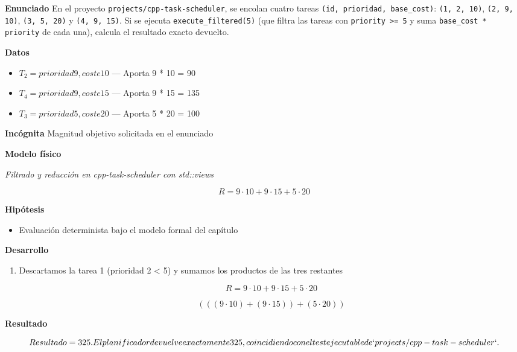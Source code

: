 \documentclass{book}
\begin{document}
\begin{tcolorbox}[title={Problema resuelto}, studiumworked, breakable]

\noindent\textbf{Enunciado}
En el proyecto \texttt{projects/cpp-task-scheduler}, se encolan cuatro tareas \texttt{(id, prioridad, base\_cost)}: \texttt{(1, 2, 10)}, \texttt{(2, 9, 10)}, \texttt{(3, 5, 20)} y \texttt{(4, 9, 15)}. Si se ejecuta \texttt{execute\_filtered(5)} (que filtra las tareas con \texttt{priority >= 5} y suma \texttt{base\_cost * priority} de cada una), calcula el resultado exacto devuelto.

\noindent\textbf{Datos}
\begin{itemize}
\item $T_{2} = prioridad 9, coste 10$ — Aporta 9 * 10 = 90
\item $T_{4} = prioridad 9, coste 15$ — Aporta 9 * 15 = 135
\item $T_{3} = prioridad 5, coste 20$ — Aporta 5 * 20 = 100
\end{itemize}

\noindent\textbf{Incógnita}
Magnitud objetivo solicitada en el enunciado

\noindent\textbf{Modelo físico}

\noindent\textit{Filtrado y reducción en cpp-task-scheduler con std::views}

\[
R = 9 \cdot 10 + 9 \cdot 15 + 5 \cdot 20
\]

\noindent\textbf{Hipótesis}
\begin{itemize}
\item Evaluación determinista bajo el modelo formal del capítulo
\end{itemize}

\noindent\textbf{Desarrollo}
\begin{enumerate}
\item
Descartamos la tarea 1 (prioridad 2 < 5) y sumamos los productos de las tres restantes

\[
R = 9 \cdot 10 + 9 \cdot 15 + 5 \cdot 20
\]

\[
\left(\left(\left(9\cdot 10\right)+\left(9\cdot 15\right)\right)+\left(5\cdot 20\right)\right)
\]
\end{enumerate}

\noindent\textbf{Resultado}

\[
Resultado = 325. El planificador devuelve exactamente 325, coincidiendo con el test ejecutable de `projects/cpp-task-scheduler`.
\]


\end{tcolorbox}
\end{document}
